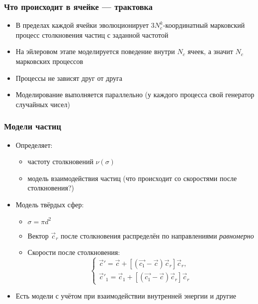 \documentclass[onlymath]{beamer}
\begin{document}
\begin{frame}
  \frametitle{Что происходит в ячейке — трактовка}
  \begin{itemize}
  \item В пределах каждой ячейки эволюционирует $3 N_c^k$-координатный
    марковский процесс столкновения частиц с заданной частотой
  \item На эйлеровом этапе моделируется поведение внутри $N_c$ ячеек,
    а значит $N_c$ марковских процессов
  \item Процессы не зависят друг от друга
  \item Моделирование выполняется параллельно (у каждого процесса свой
    генератор случайных чисел)
  \end{itemize}
\end{frame}
\begin{frame}
  \frametitle{Модели частиц}
  \begin{itemize}
  \item Определяет:
    \begin{itemize}
    \item частоту столкновений $\nu(\sigma)$
    \item модель взаимодействия частиц (что
      происходит со скоростями после столкновения?)
    \end{itemize}
  \item Модель твёрдых сфер: 
    \begin{itemize}
    \item $\sigma = \pi d^2$
    \item Вектор $\vec{c}_r$ после столкновения распределён по
      направлениями \emph{равномерно}
    \item Скорости после столкновения:
      \begin{equation*}
        \begin{cases}
          \vec{c}' = \vec{c} + [(\vec{c_1} - \vec{c})\vec{c}_r]\vec{c}_r,\\
          \vec{c}'_1 = \vec{c}_1 + [(\vec{c_1} - \vec{c})\vec{c}_r]\vec{c}_r
        \end{cases}
      \end{equation*}
    \end{itemize}
  \item Есть модели с учётом при взаимодействии внутренней энергии и
    другие
  \end{itemize}
\end{frame}
\end{document}
